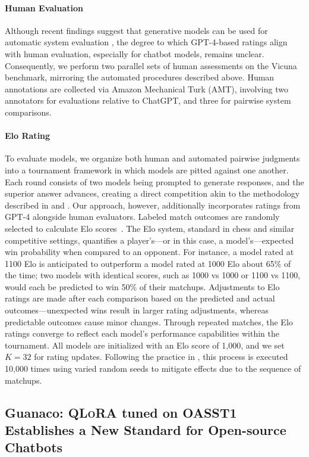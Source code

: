 \paragraph{Human Evaluation} Although recent findings suggest that generative models can be used for automatic system evaluation \citep{fu2023gptscore}, the degree to which GPT-4-based ratings align with human evaluation, especially for chatbot models, remains unclear. Consequently, we perform two parallel sets of human assessments on the Vicuna benchmark, mirroring the automated procedures described above. Human annotations are collected via Amazon Mechanical Turk (AMT), involving two annotators for evaluations relative to ChatGPT, and three for pairwise system comparisons.

\paragraph{Elo Rating} To evaluate models, we organize both human and automated pairwise judgments into a tournament framework in which models are pitted against one another. Each round consists of two models being prompted to generate responses, and the superior answer advances, creating a direct competition akin to the methodology described in \citet{bai2022training} and \citet{vicuna2023}. Our approach, however, additionally incorporates ratings from GPT-4 alongside human evaluators. Labeled match outcomes are randomly selected to calculate Elo scores~\citep{elo1967proposed,elo1978rating}. The Elo system, standard in chess and similar competitive settings, quantifies a player’s—or in this case, a model’s—expected win probability when compared to an opponent. For instance, a model rated at 1100 Elo is anticipated to outperform a model rated at 1000 Elo about 65\% of the time; two models with identical scores, such as 1000 vs 1000 or 1100 vs 1100, would each be predicted to win 50\% of their matchups. Adjustments to Elo ratings are made after each comparison based on the predicted and actual outcomes—unexpected wins result in larger rating adjustments, whereas predictable outcomes cause minor changes. Through repeated matches, the Elo ratings converge to reflect each model’s performance capabilities within the tournament. All models are initialized with an Elo score of 1,000, and we set $K=32$ for rating updates. Following the practice in \citet{vicuna2023}, this process is executed 10,000 times using varied random seeds to mitigate effects due to the sequence of matchups.

\subsection{\textbf{Guanaco}: \textsc{QLoRA} tuned on OASST1 Establishes a New Standard for Open-source Chatbots}

